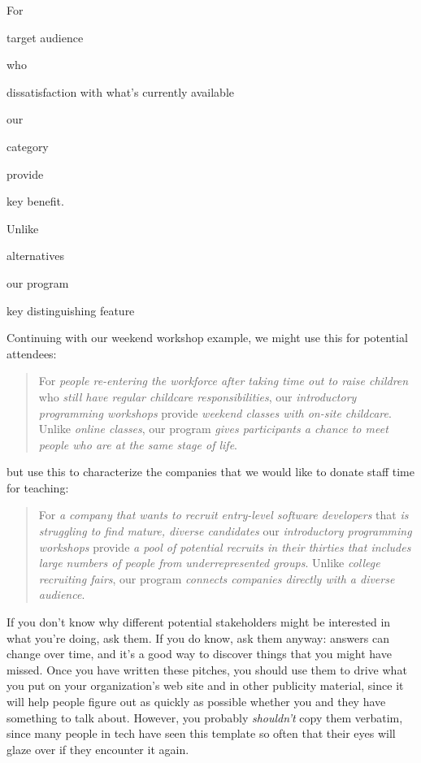 \documentclass[10pt,statementpaper]{memoir}
\begin{document}
For

target audience

who

dissatisfaction with what's currently available

our

category

provide

key benefit.

Unlike

alternatives

our program

key distinguishing feature

Continuing with our weekend workshop example, we might use this for
potential attendees:

\begin{quote}
For \emph{people re-entering the workforce after taking time out to
raise children} who \emph{still have regular childcare
responsibilities}, our \emph{introductory programming workshops} provide
\emph{weekend classes with on-site childcare}. Unlike \emph{online
classes}, our program \emph{gives participants a chance to meet people
who are at the same stage of life}.
\end{quote}

but use this to characterize the companies that we would like to donate
staff time for teaching:

\begin{quote}
For \emph{a company that wants to recruit entry-level software
developers} that \emph{is struggling to find mature, diverse candidates}
our \emph{introductory programming workshops} provide \emph{a pool of
potential recruits in their thirties that includes large numbers of
people from underrepresented groups}. Unlike \emph{college recruiting
fairs}, our program \emph{connects companies directly with a diverse
audience}.
\end{quote}

If you don't know why different potential stakeholders might be
interested in what you're doing, ask them. If you do know, ask them
anyway: answers can change over time, and it's a good way to discover
things that you might have missed. Once you have written these pitches,
you should use them to drive what you put on your organization's web
site and in other publicity material, since it will help people figure
out as quickly as possible whether you and they have something to talk
about. However, you probably \emph{shouldn't} copy them verbatim, since
many people in tech have seen this template so often that their eyes
will glaze over if they encounter it again.
\end{document}
